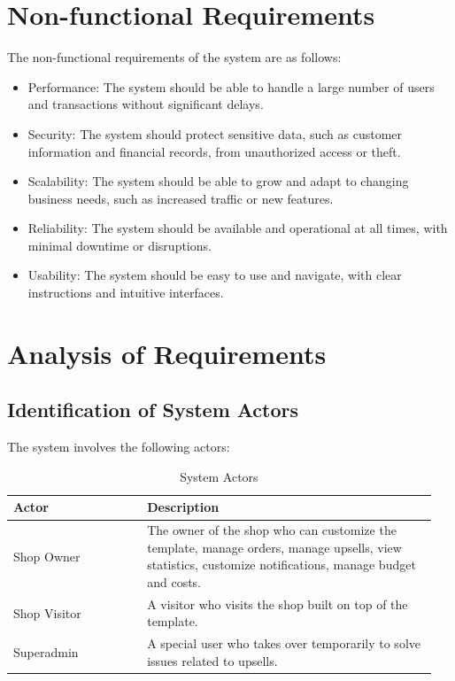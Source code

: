 \section{Non-functional Requirements}
The non-functional requirements of the system are as follows:
\begin{itemize}
    \item Performance: The system should be able to handle a large number of users and transactions without significant delays.
    \item Security: The system should protect sensitive data, such as customer information and financial records, from unauthorized access or theft.
    \item Scalability: The system should be able to grow and adapt to changing business needs, such as increased traffic or new features.
    \item Reliability: The system should be available and operational at all times, with minimal downtime or disruptions.
    \item Usability: The system should be easy to use and navigate, with clear instructions and intuitive interfaces.
\end{itemize}

\section{Analysis of Requirements}
\subsection{Identification of System Actors}
The system involves the following actors:

\begin{table}[H] %
\centering
\begin{tabular}{|p{0.3\linewidth}|p{0.65\linewidth}|} %
\hline
\textbf{Actor} & \textbf{Description} \\
\hline
Shop Owner & The owner of the shop who can customize the template, manage orders, manage upsells, view statistics, customize notifications, manage budget and costs. \\
\hline
Shop Visitor & A visitor who visits the shop built on top of the template. \\
\hline
Superadmin & A special user who takes over temporarily to solve issues related to upsells. \\
\hline
\end{tabular}
\caption{System Actors}
\label{tab:actors}
\end{table}

